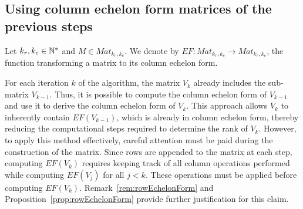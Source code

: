 \documentclass[11pt]{llncs}
\begin{document}
\subsection{Using column echelon form matrices of the previous steps}\label{subsubsection:optEchelonForm}




\begin{definition}
    Let $k_r,k_c\in \mathbb{N}^*$ and $M \in Mat_{k_r,k_c}$.
    We denote by $EF: Mat_{k_r,k_c} \rightarrow Mat_{k_r,k_c}$, the function transforming a matrix to its column echelon form.    
\end{definition}




For each iteration \( k \) of the algorithm, the matrix \( V_k \) already includes the sub-matrix \( V_{k-1} \). Thus, it is possible to compute the column echelon form of \( V_{k-1} \) and use it to derive the column echelon form of \( V_k \). 
This approach allows \( V_k \) to inherently contain \( EF(V_{k-1}) \), which is already in column echelon form, thereby reducing the computational steps required to determine the rank of \( V_k \).
However, to apply this method effectively, careful attention must be paid during the construction of the matrix. 
Since rows are appended to the matrix at each step, computing \( EF(V_k) \) requires keeping track of all column operations performed while computing \( EF(V_j) \) for all \( j < k \). 
These operations must be applied before computing \( EF(V_k) \).
Remark~\ref{rem:rowEchelonForm} and Proposition~\ref{prop:rowEchelonForm} provide further justification for this claim.
\end{document}
